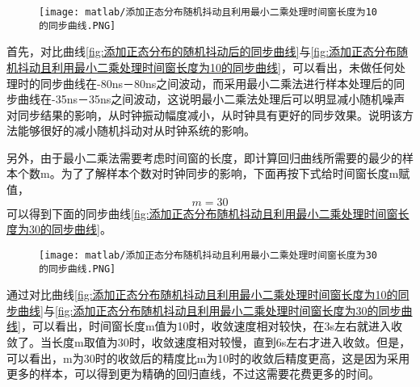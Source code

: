 \begin{figure}[htbp]
  \centering
  \begin{minipage}[b]{1\textwidth}
    \captionstyle{\centering}
    \centering
    \texttt{[image: matlab/添加正态分布随机抖动且利用最小二乘处理时间窗长度为10的同步曲线.PNG]}
  \end{minipage}     
\end{figure}

首先，对比曲线\ref{fig:添加正态分布的随机抖动后的同步曲线}与\ref{fig:添加正态分布随机抖动且利用最小二乘处理时间窗长度为10的同步曲线}，可以看出，未做任何处理时的同步曲线在-80ns－80ns之间波动，而采用最小二乘法进行样本处理后的同步曲线在-35ns－35ns之间波动，这说明最小二乘法处理后可以明显减小随机噪声对同步结果的影响，从时钟振动幅度减小，从时钟具有更好的同步效果。说明该方法能够很好的减小随机抖动对从时钟系统的影响。

另外，由于最小二乘法需要考虑时间窗的长度，即计算回归曲线所需要的最少的样本个数m。为了了解样本个数对时钟同步的影响，下面再按下式给时间窗长度m赋值，
\begin{equation}
  m = 30
\end{equation}
可以得到下面的同步曲线\ref{fig:添加正态分布随机抖动且利用最小二乘处理时间窗长度为30的同步曲线}。
\begin{figure}[!hbp]
  \centering
  \begin{minipage}[b]{1\textwidth}
    \captionstyle{\centering}
    \centering
    \texttt{[image: matlab/添加正态分布随机抖动且利用最小二乘处理时间窗长度为30的同步曲线.PNG]}
  \end{minipage}     
\end{figure}

通过对比曲线\ref{fig:添加正态分布随机抖动且利用最小二乘处理时间窗长度为10的同步曲线}与\ref{fig:添加正态分布随机抖动且利用最小二乘处理时间窗长度为30的同步曲线}，可以看出，时间窗长度m值为10时，收敛速度相对较快，在3s左右就进入收敛了。当长度m取值为30时，收敛速度相对较慢，直到6s左右才进入收敛。但是，可以看出，m为30时的收敛后的精度比m为10时的收敛后精度更高，这是因为采用更多的样本，可以得到更为精确的回归直线，不过这需要花费更多的时间。

